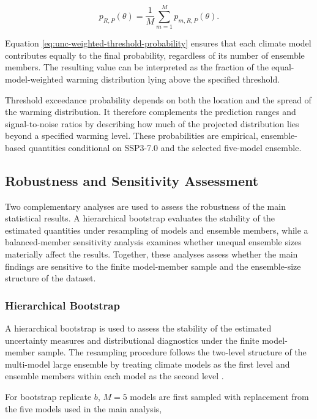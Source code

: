 \documentclass[
]{krantz}
\begin{document}
\begin{equation}
p_{R,P}(\theta)
=
\frac{1}{M}
\sum_{m=1}^{M}
p_{m,R,P}(\theta).
\label{eq:unc-weighted-threshold-probability}
\end{equation}

Equation \eqref{eq:unc-weighted-threshold-probability} ensures that each climate model contributes equally to the final probability, regardless of its number of ensemble members. The resulting value can be interpreted as the fraction of the equal-model-weighted warming distribution lying above the specified threshold.

Threshold exceedance probability depends on both the location and the spread of the warming distribution. It therefore complements the prediction ranges and signal-to-noise ratios by describing how much of the projected distribution lies beyond a specified warming level. These probabilities are empirical, ensemble-based quantities conditional on SSP3-7.0 and the selected five-model ensemble.

\subsection{Robustness and Sensitivity Assessment}\label{robustness-and-sensitivity-assessment}

Two complementary analyses are used to assess the robustness of the main statistical results. A hierarchical bootstrap evaluates the stability of the estimated quantities under resampling of models and ensemble members, while a balanced-member sensitivity analysis examines whether unequal ensemble sizes materially affect the results. Together, these analyses assess whether the main findings are sensitive to the finite model-member sample and the ensemble-size structure of the dataset.

\subsubsection{Hierarchical Bootstrap}\label{hierarchical-bootstrap}

A hierarchical bootstrap is used to assess the stability of the estimated uncertainty measures and distributional diagnostics under the finite model-member sample. The resampling procedure follows the two-level structure of the multi-model large ensemble by treating climate models as the first level and ensemble members within each model as the second level \citep{Saravanan2020}.

For bootstrap replicate \(b\), \(M=5\) models are first sampled with replacement from the five models used in the main analysis,
\end{document}
